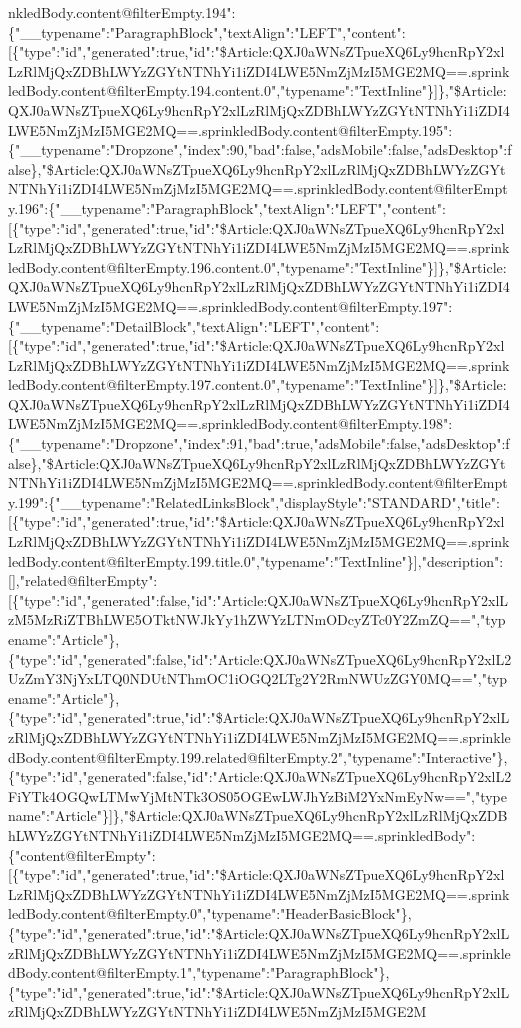 nkledBody.content@filterEmpty.194":\{"\_\_typename":"ParagraphBlock","textAlign":"LEFT","content":{[}\{"type":"id","generated":true,"id":"\$Article:QXJ0aWNsZTpueXQ6Ly9hcnRpY2xlLzRlMjQxZDBhLWYzZGYtNTNhYi1iZDI4LWE5NmZjMzI5MGE2MQ==.sprinkledBody.content@filterEmpty.194.content.0","typename":"TextInline"\}{]}\},"\$Article:QXJ0aWNsZTpueXQ6Ly9hcnRpY2xlLzRlMjQxZDBhLWYzZGYtNTNhYi1iZDI4LWE5NmZjMzI5MGE2MQ==.sprinkledBody.content@filterEmpty.195":\{"\_\_typename":"Dropzone","index":90,"bad":false,"adsMobile":false,"adsDesktop":false\},"\$Article:QXJ0aWNsZTpueXQ6Ly9hcnRpY2xlLzRlMjQxZDBhLWYzZGYtNTNhYi1iZDI4LWE5NmZjMzI5MGE2MQ==.sprinkledBody.content@filterEmpty.196":\{"\_\_typename":"ParagraphBlock","textAlign":"LEFT","content":{[}\{"type":"id","generated":true,"id":"\$Article:QXJ0aWNsZTpueXQ6Ly9hcnRpY2xlLzRlMjQxZDBhLWYzZGYtNTNhYi1iZDI4LWE5NmZjMzI5MGE2MQ==.sprinkledBody.content@filterEmpty.196.content.0","typename":"TextInline"\}{]}\},"\$Article:QXJ0aWNsZTpueXQ6Ly9hcnRpY2xlLzRlMjQxZDBhLWYzZGYtNTNhYi1iZDI4LWE5NmZjMzI5MGE2MQ==.sprinkledBody.content@filterEmpty.197":\{"\_\_typename":"DetailBlock","textAlign":"LEFT","content":{[}\{"type":"id","generated":true,"id":"\$Article:QXJ0aWNsZTpueXQ6Ly9hcnRpY2xlLzRlMjQxZDBhLWYzZGYtNTNhYi1iZDI4LWE5NmZjMzI5MGE2MQ==.sprinkledBody.content@filterEmpty.197.content.0","typename":"TextInline"\}{]}\},"\$Article:QXJ0aWNsZTpueXQ6Ly9hcnRpY2xlLzRlMjQxZDBhLWYzZGYtNTNhYi1iZDI4LWE5NmZjMzI5MGE2MQ==.sprinkledBody.content@filterEmpty.198":\{"\_\_typename":"Dropzone","index":91,"bad":true,"adsMobile":false,"adsDesktop":false\},"\$Article:QXJ0aWNsZTpueXQ6Ly9hcnRpY2xlLzRlMjQxZDBhLWYzZGYtNTNhYi1iZDI4LWE5NmZjMzI5MGE2MQ==.sprinkledBody.content@filterEmpty.199":\{"\_\_typename":"RelatedLinksBlock","displayStyle":"STANDARD","title":{[}\{"type":"id","generated":true,"id":"\$Article:QXJ0aWNsZTpueXQ6Ly9hcnRpY2xlLzRlMjQxZDBhLWYzZGYtNTNhYi1iZDI4LWE5NmZjMzI5MGE2MQ==.sprinkledBody.content@filterEmpty.199.title.0","typename":"TextInline"\}{]},"description":{[}{]},"related@filterEmpty":{[}\{"type":"id","generated":false,"id":"Article:QXJ0aWNsZTpueXQ6Ly9hcnRpY2xlLzM5MzRiZTBhLWE5OTktNWJkYy1hZWYzLTNmODcyZTc0Y2ZmZQ==","typename":"Article"\},\{"type":"id","generated":false,"id":"Article:QXJ0aWNsZTpueXQ6Ly9hcnRpY2xlL2UzZmY3NjYxLTQ0NDUtNThmOC1iOGQ2LTg2Y2RmNWUzZGY0MQ==","typename":"Article"\},\{"type":"id","generated":true,"id":"\$Article:QXJ0aWNsZTpueXQ6Ly9hcnRpY2xlLzRlMjQxZDBhLWYzZGYtNTNhYi1iZDI4LWE5NmZjMzI5MGE2MQ==.sprinkledBody.content@filterEmpty.199.related@filterEmpty.2","typename":"Interactive"\},\{"type":"id","generated":false,"id":"Article:QXJ0aWNsZTpueXQ6Ly9hcnRpY2xlL2FiYTk4OGQwLTMwYjMtNTk3OS05OGEwLWJhYzBiM2YxNmEyNw==","typename":"Article"\}{]}\},"\$Article:QXJ0aWNsZTpueXQ6Ly9hcnRpY2xlLzRlMjQxZDBhLWYzZGYtNTNhYi1iZDI4LWE5NmZjMzI5MGE2MQ==.sprinkledBody":\{"content@filterEmpty":{[}\{"type":"id","generated":true,"id":"\$Article:QXJ0aWNsZTpueXQ6Ly9hcnRpY2xlLzRlMjQxZDBhLWYzZGYtNTNhYi1iZDI4LWE5NmZjMzI5MGE2MQ==.sprinkledBody.content@filterEmpty.0","typename":"HeaderBasicBlock"\},\{"type":"id","generated":true,"id":"\$Article:QXJ0aWNsZTpueXQ6Ly9hcnRpY2xlLzRlMjQxZDBhLWYzZGYtNTNhYi1iZDI4LWE5NmZjMzI5MGE2MQ==.sprinkledBody.content@filterEmpty.1","typename":"ParagraphBlock"\},\{"type":"id","generated":true,"id":"\$Article:QXJ0aWNsZTpueXQ6Ly9hcnRpY2xlLzRlMjQxZDBhLWYzZGYtNTNhYi1iZDI4LWE5NmZjMzI5MGE2M